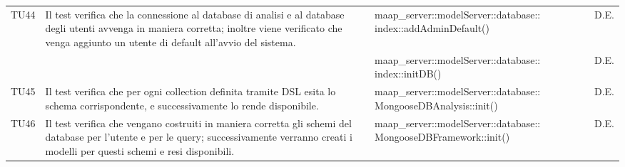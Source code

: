 \begin{center}
\begin{longtable}{|p{1cm}|p{5cm}|p{6cm}|p{1cm}|}
\midrule
TU44
& Il test verifica che la connessione al database di analisi e al database degli utenti avvenga in maniera corretta; inoltre viene verificato che venga aggiunto un utente di default all'avvio del sistema.
& maap\_server::modelServer::database:: index::addAdminDefault()
& D.E.\\
& & maap\_server::modelServer::database:: index::initDB()
& D.E.\\

\midrule
TU45
& Il test verifica che per ogni collection definita tramite DSL esita lo schema corrispondente, e successivamente lo rende disponibile.
& maap\_server::modelServer::database:: MongooseDBAnalysis::init()
& D.E.\\

\midrule
TU46
& Il test verifica che vengano costruiti in maniera corretta gli schemi del database per l'utente e per le query; successivamente verranno creati i modelli per questi schemi e resi disponibili.
& maap\_server::modelServer::database:: MongooseDBFramework::init()
& D.E.\\


\end{longtable}
\end{center}

